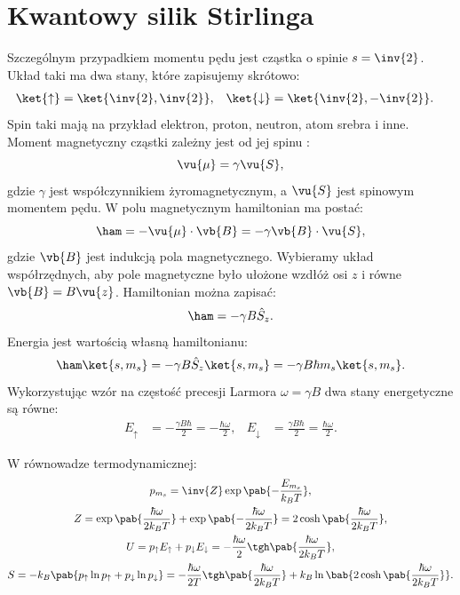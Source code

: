 
\section{Kwantowy silik Stirlinga}
Szczególnym przypadkiem momentu pędu jest cząstka o spinie \(s = \inv{2}\). Układ taki ma dwa stany, które zapisujemy skrótowo:
\begin{align}
	\ket{\uparrow} &= \ket{\inv{2},\inv{2}}, &
	\ket{\downarrow} &= \ket{\inv{2},-\inv{2}}.
\end{align}
Spin taki mają na przykład elektron, proton, neutron, atom srebra i inne. Moment magnetyczny cząstki zależny jest od jej spinu \cite{griffiths_kwant}:
\begin{equation}
	\vu{\mu} = \gamma \vu{S},
\end{equation}
gdzie \(\gamma\) jest współczynnikiem żyromagnetycznym, a \(\vu{S}\) jest spinowym momentem pędu. W polu magnetycznym hamiltonian ma postać:
\begin{equation}\label{eq:def_hamiltonian_magnetyczny}
	\ham = - \vu{\mu} \cdot \vb{B} = - \gamma \vb{B} \cdot \vu{S},
\end{equation}
gdzie \(\vb{B}\) jest indukcją pola magnetycznego. Wybieramy układ współrzędnych, aby pole magnetyczne było ułożone wzdłóż osi \(z\) i równe \(\vb{B} = B \vu{z}\). Hamiltonian można zapisać:
\begin{equation}
	\ham = - \gamma B \hat{S}_z.
\end{equation}
Energia jest wartością własną hamiltonianu:
\begin{equation}
	\ham \ket{s,m_s} =
	- \gamma B \hat{S}_z \ket{s,m_s} =
	- \gamma B \hbar m_s \ket{s,m_s}.
\end{equation}
Wykorzystując wzór na częstość precesji Larmora \(\omega = \gamma B\) dwa stany energetyczne są równe:
\begin{align}
	E_{\uparrow}   &= - \frac{\gamma B \hbar}{2} = - \frac{\hbar\omega}{2}, &
	E_{\downarrow} &=   \frac{\gamma B \hbar}{2} =   \frac{\hbar\omega}{2}.
\end{align}

W równowadze termodynamicznej:
\begin{gather}
	p_{m_s} = \inv{Z} \exp\pab{-\frac{E_{m_s}}{k_B T}}, \\
	Z = \exp\pab{\frac{\hbar\omega}{2 k_B T}} + \exp\pab{-\frac{\hbar\omega}{2 k_B T}} = 2\cosh\pab{\frac{\hbar\omega}{2 k_B T}}, \\
	U = p_{\uparrow}E_{\uparrow} + p_{\downarrow}E_{\downarrow} = - \frac{\hbar\omega}{2} \tgh\pab{\frac{\hbar\omega}{2 k_B T}}, \\
	S = -k_B\pab{p_{\uparrow} \ln p_{\uparrow} + p_{\downarrow} \ln p_{\downarrow}} =
	- \frac{\hbar\omega}{2T} \tgh\pab{\frac{\hbar\omega}{2 k_B T}} + k_B \ln\bab{2\cosh\pab{\frac{\hbar\omega}{2 k_B T}}}.
\end{gather}


